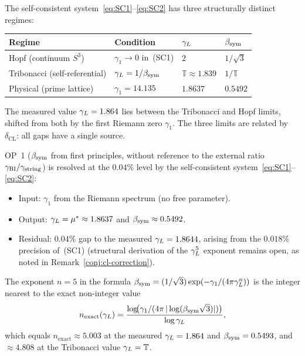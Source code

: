 \begin{remark}
\label{rem:three-limits}
The self-consistent system~\eqref{eq:SC1}--\eqref{eq:SC2} has three
structurally distinct regimes:
\begin{center}
\renewcommand{\arraystretch}{1.4}
\begin{tabular}{llll}
\toprule
Regime & Condition & $\gamma_L$ & $\beta_{\mathrm{sym}}$ \\
\midrule
Hopf (continuum $S^3$)    & $\gamma_1\to 0$ in~(SC1) & $2$ & $1/\sqrt{3}$ \\
Tribonacci (self-referential) & $\gamma_L = 1/\beta_{\mathrm{sym}}$          & $\mathbb{T}\approx 1.839$ & $1/\mathbb{T}$ \\
Physical (prime lattice)  & $\gamma_1 = 14.135$      & $1.8637$ & $0.5492$ \\
\bottomrule
\end{tabular}
\end{center}
The measured value $\gamma_L = 1.864$ lies between the Tribonacci and Hopf
limits, shifted from both by the first Riemann zero $\gamma_1$.
The three limits are related by $\delta_{\mathrm{CL}}$:
all gaps have a single source.
\end{remark}

\begin{corollary}[OP~1 resolved up to $0.04\%$]
\label{cor:op1-resolved}
OP~1 ($\beta_{\mathrm{sym}}$ from first principles, without reference to the external
ratio $\gamma_{\mathrm{BI}}/\gamma_{\mathrm{string}}$) is resolved at the $0.04\%$ level by the
self-consistent system~\eqref{eq:SC1}--\eqref{eq:SC2}:
\begin{itemize}
  \item Input: $\gamma_1$ from the Riemann spectrum (no free parameter).
  \item Output: $\gamma_L = \mu^* \approx 1.8637$ and
    $\beta_{\mathrm{sym}} \approx 0.5492$.
  \item Residual: $0.04\%$ gap to the measured $\gamma_L = 1.8644$,
    arising from the $0.018\%$ precision of~(SC1)
    (structural derivation of the $\gamma_L^5$ exponent remains open,
    as noted in Remark~\ref{conj:cl-correction}).
\end{itemize}
\end{corollary}

\begin{proposition}
\label{prop:exponent-5}
The exponent $n=5$ in the formula
$\beta_{\mathrm{sym}} = (1/\sqrt{3})\exp(-\gamma_1/(4\pi\gamma_L^n))$ is the integer
nearest to the exact non-integer value
\[
  n_{\mathrm{exact}}(\gamma_L)
  = \frac{\log\!\bigl(\gamma_1/(4\pi\,|\log(\beta_{\mathrm{sym}}\sqrt{3})|)\bigr)}
         {\log\gamma_L},
\]
which equals $n_{\mathrm{exact}} \approx 5.003$ at the measured
$\gamma_L = 1.864$ and $\beta_{\mathrm{sym}} = 0.5493$, and $\approx 4.808$ at the
Tribonacci value $\gamma_L = \mathbb{T}$.
\end{proposition}

